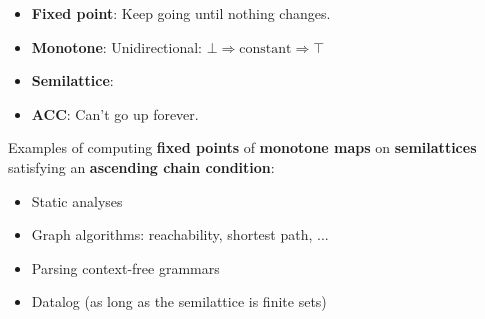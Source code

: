 \documentclass{beamer}
\begin{document}

\begin{frame}


  \large
  \begin{itemize}
  \item \textbf{Fixed point}: Keep going until nothing changes.
  \item \textbf{Monotone}: Unidirectional: $\bot \Rightarrow \text{constant} \Rightarrow \top$
  \item \textbf{Semilattice}:\\

    \begin{center}\large
    \end{center}

  \item \textbf{ACC}: Can't go up forever.
  \end{itemize}

\end{frame}


\begin{frame}%

  \large Examples of computing \textbf{fixed points} of \textbf{monotone maps} on
  \textbf{semilattices} satisfying an \textbf{ascending chain condition}:

  \Large %
  \begin{itemize}
  \item Static analyses
  \item Graph algorithms: reachability, shortest path, ...
  \item Parsing context-free grammars
  \item Datalog {\large (as long as the semilattice is finite sets)}
  \end{itemize}

\end{frame}
\end{document}
